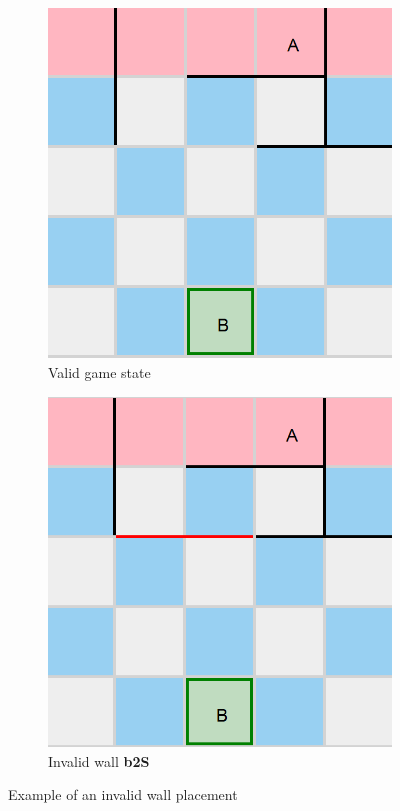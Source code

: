 \begin{figure}[!ht]
    \begin{subfigure}{0.4\textwidth}
      \includegraphics[width=\textwidth]{../img/GameBoard/arbitrary_state.png}
      \caption{Valid game state}
      \label{fig:ValidState}
    \end{subfigure}
    \hfill
    \begin{subfigure}{0.4\textwidth}
      \includegraphics[width=\textwidth]{../img/GameBoard/invalid_wall.png}
      \caption{Invalid wall \textbf{b2S}}
      \label{fig:WallBlocked}
    \end{subfigure}
    \caption{Example of an invalid wall placement}
    \label{fig:WallBlockingMove}
\end{figure}

